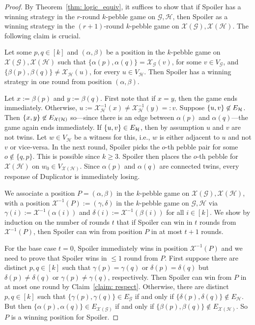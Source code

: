 \documentclass[a4paper,english, thm-restate]{lipics-v2021}
\DeclarePairedDelimiter\set{\lbrace}{\rbrace}
\newcommand{\graphG}{\mathcal{G}}
\newcommand{\graphH}{\mathcal{H}}
\newcommand{\vertexG}{V_{\graphG}}
\newcommand{\vertexH}{V_{\graphH}}
\newcommand{\edgeG}{E_{\graphG}}
\newcommand{\edgeH}{E_{\graphH}}
\newcommand{\graphXG}{\mathcal{X}(\mathcal{G})}
\newcommand{\graphXH}{\mathcal{X}(\mathcal{H})}
\newcommand{\vertexXH}{V_{\graphXH}}
\newcommand{\edgeXG}{E_{\graphXG}}
\newcommand{\edgeXH}{E_{\graphXH}}
\newcommand{\X}{\mathcal{X}}
\newcommand{\XG}{\X_{\graphG}}
\newcommand{\XH}{\X_{\graphH}}
\newcommand{\XHI}{\X^{-1}_{\graphH}}
\newcommand{\XI}{\X^{-1}}
\begin{document}
%
\begin{proof}
By Theorem~\ref{thm: logic_equiv},
it suffices to show that if Spoiler has a winning strategy in the $r$-round $k$-pebble game on $\graphG, \graphH$, then Spoiler as a winning strategy in the $(r+1)$-round $k$-pebble game on $\graphXG, \graphXH$. The following claim is crucial. 

\begin{claim} \label{claim: respect}
Let some $p,q\in[k]$ and $(\alpha, \beta)$ be a position in the $k$-pebble game on $\graphXG, \graphXH$ such that  $\{\alpha(p), \alpha(q) \} = \XG(v)$, for some $v \in \vertexG$, and $\{\beta(p), \beta(q) \} \neq \XH(u)$, for every $u \in \vertexH$. Then Spoiler has a winning strategy in one round from position $(\alpha, \beta)$.
\end{claim}

\begin{claimproof} 
Let $x:=\beta(p)$ and $y:=\beta(q)$. First note that if $x=y$, then the game ends immediately. Otherwise, $u:=\XHI(x) \neq \XHI(y)=:v$. Suppose $\set{u,v} \not \in \edgeH$. Then $\set{x,y} \not \in \edgeXH$ so---since there is an edge between $\alpha(p)$ and $\alpha(q)$---the game again ends immediately.
If $\set{u,v} \in \edgeH$, then by assumption $u$ and $v$ are not twins.
Let $w \in \vertexH$ be a witness for this, i.e., $w$ is either adjacent to $u$ and not $v$ or vice-versa.
In the next round, Spoiler picks the $o$-th pebble pair for some $o \not \in \{q, p\}$. This is possible since $k\ge 3$. Spoiler then places the $o$-th pebble for $\graphXH$ on $w_0 \in \vertexXH$. Since $\alpha(p)$ and $\alpha(q)$ are connected twins, every response of Duplicator is immediately losing.
\end{claimproof}

We associate a position $P = (\alpha, \beta)$  in the  $k$-pebble game on $\graphXG, \graphXH$, with a position $\XI(P):= (\gamma, \delta) $ in the $k$-pebble game on $\graphG, \graphH$ via $\gamma(i) := \XI(\alpha(i))$ and $\delta(i) := \XI(\beta(i))$ for all $i \in [k]$.
We show by induction on the number of rounds $t$ that if Spoiler can win in $t$ rounds from $\XI(P)$, then Spoiler can win from position $P$ in at most $t+1$ rounds. 

%
%
%
For the base case $t=0$, Spoiler immediately wins in position
$\XI(P)$ and we need to prove that Spoiler wins in $\leq 1$ round from
$P$.
First suppose there are distinct $p,q\in[k]$ such that
$\gamma(p) = \gamma(q)$ or $\delta(p) = \delta(q)$
but $\delta(p) \neq \delta(q)$ or $\gamma(p) \neq \gamma(q)$, respectively.
Then Spoiler can win from $P$ in at most one round by Claim~\ref{claim: respect}. Otherwise, there are distinct $p,q \in [k]$ such that $\{\gamma(p), \gamma(q)\} \in \edgeG$ if and only if $\{\delta(p), \delta(q)\} \not\in \edgeH$. But then $\{\alpha(p), \alpha(q)\} \in \edgeXG$ if and only if $\{\beta(p), \beta(q)\} \not\in \edgeXH$.
So $P$ is a winning position for Spoiler.


\end{proof}
\end{document}
